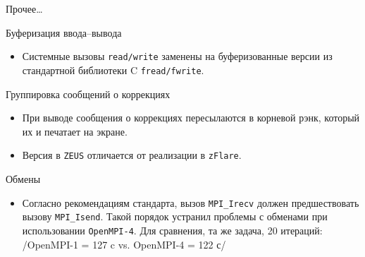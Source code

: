 \documentclass[xcolor={svgnames,table,hyperref},9pt]{beamer}
\newcommand*{\code}[1]{\texttt{\small #1}}
\begin{document}
\begin{frame}{Прочее\ldots}
  \begin{block}{Буферизация ввода--вывода}\begin{itemize}
    \item Системные вызовы \code{read/write} заменены на буферизованные версии из стандартной библиотеки C \code{fread/fwrite}.
  \end{itemize}\end{block}

  \begin{block}{Группировка сообщений о коррекциях}\begin{itemize}
    \item При выводе сообщения о коррекциях пересылаются в корневой рэнк, который их и печатает на экране.
    \item Версия в \code{ZEUS} отличается от реализации в \code{zFlare}.
  \end{itemize}\end{block}

  \begin{block}{Обмены}\begin{itemize}
    \item Согласно рекомендациям стандарта, вызов \code{MPI\_Irecv} должен предшествовать вызову \code{MPI\_Isend}. Такой порядок устранил проблемы с обменами при использовании \code{OpenMPI-4}. Для сравнения, та же задача, 20 итераций:
    \txt/OpenMPI-1 = 127 c vs. OpenMPI-4 = 122 с/
  \end{itemize}\end{block}
\end{frame}
\end{document}
